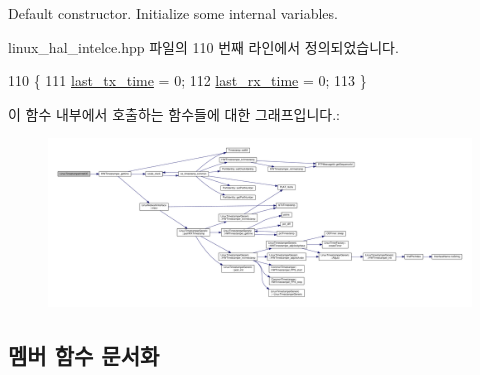 Default constructor. Initialize some internal variables. 



linux\+\_\+hal\+\_\+intelce.\+hpp 파일의 110 번째 라인에서 정의되었습니다.


\begin{DoxyCode}
110                               \{
111         \hyperlink{class_linux_timestamper_intel_c_e_ad099415a2577527cc1f7a0258f050d57}{last\_tx\_time} = 0;
112         \hyperlink{class_linux_timestamper_intel_c_e_af1dded3f45070e35eba64d2474864dfb}{last\_rx\_time} = 0;
113     \}
\end{DoxyCode}


이 함수 내부에서 호출하는 함수들에 대한 그래프입니다.\+:
\nopagebreak
\begin{figure}[H]
\begin{center}
\leavevmode
\includegraphics[width=350pt]{class_linux_timestamper_intel_c_e_a66574fb89b9d6f05e847a6269c79ae7a_cgraph}
\end{center}
\end{figure}




\subsection{멤버 함수 문서화}
